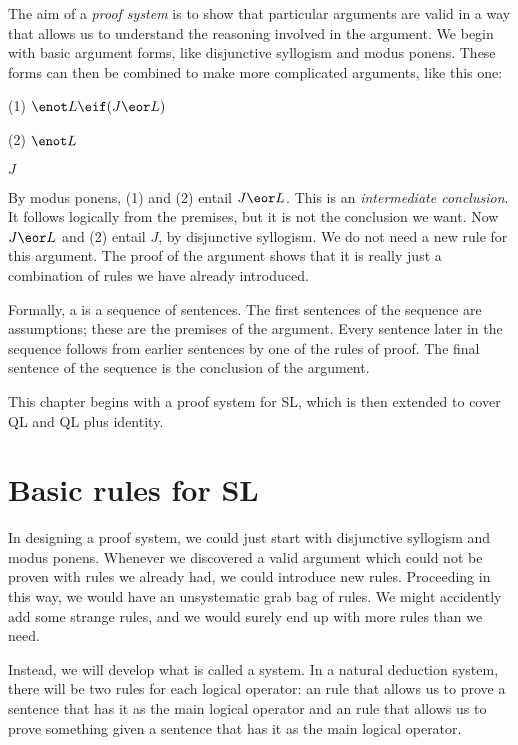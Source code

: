 The aim of a \emph{proof system} is to show that particular arguments are valid in a way that allows us to understand the reasoning involved in the argument. We begin with basic argument forms, like disjunctive syllogism and modus ponens. These forms can then be combined to make more complicated arguments, like this one:



\begin{earg}
\item[(1)] $\enot L \eif (J \eor L)$
\item[(2)] $\enot L$
\item[\therefore] $J$
\end{earg}
By modus ponens, (1) and (2) entail $J \eor L$. This is an \emph{intermediate conclusion}. It follows logically from the premises, but it is not the conclusion we want. Now $J \eor L$ and (2) entail $J$, by disjunctive syllogism. We do not need a new rule for this argument. The proof of the argument shows that it is really just a combination of rules we have already introduced.

Formally, a  is a sequence of sentences. The first sentences of the sequence are assumptions; these are the premises of the argument. Every sentence later in the sequence follows from earlier sentences by one of the rules of proof. The final sentence of the sequence is the conclusion of the argument.

This chapter begins with a proof system for SL, which is then extended to cover QL and QL plus identity.


\section{Basic rules for SL}

In designing a proof system, we could just start with disjunctive syllogism and modus ponens. Whenever we discovered a valid argument which could not be proven with rules we already had, we could introduce new rules. Proceeding in this way, we would have an unsystematic grab bag of rules. We might accidently add some strange rules, and we would surely end up with more rules than we need.

Instead, we will develop what is called a  system. In a natural deduction system, there will be two rules for each logical operator: an  rule that allows us to prove a sentence that has it as the main logical operator and an  rule that allows us to prove something given a sentence that has it as the main logical operator.

